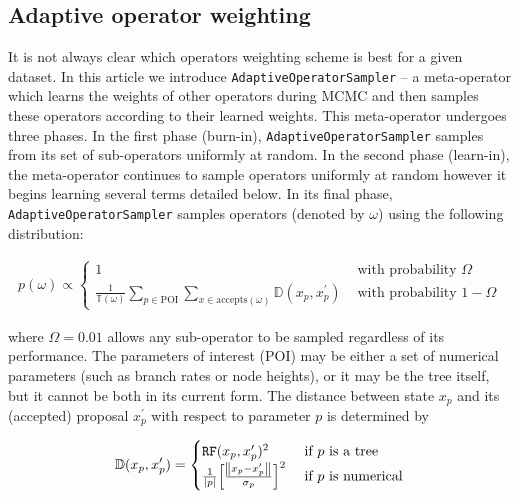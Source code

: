 \documentclass[10pt,letterpaper]{article}
\begin{document}
\clearpage
\subsection*{Adaptive operator weighting}
\label{sect:adaptiveSampling}






It is not always clear which operators weighting scheme is best for a given dataset.
In this article we introduce \texttt{AdaptiveOperatorSampler} -- a meta-operator which learns the weights of other operators during MCMC and then samples these operators according to their learned weights.
This meta-operator undergoes three phases.
In the first phase (burn-in), \texttt{AdaptiveOperatorSampler} samples from its set of sub-operators uniformly at random.
In the second phase (learn-in), the meta-operator continues to sample operators uniformly at random however it begins learning several terms detailed below.
In its final phase, \texttt{AdaptiveOperatorSampler} samples operators (denoted by $\omega$) using the following distribution:


\begin{align}
\label{eqn:adaptiveSampler}
	p(\omega) \propto \begin{cases} 1 & \text{ with probability } \Omega \\ \frac{1}{\mathbb{T}(\omega)} \sum\limits_{p \in \text{POI}}  \sum\limits_{x \in \text{accepts}(\omega)}  \mathbb{D}(x_p, x_p^\prime) & \text{ with probability } 1-\Omega \end{cases}
\end{align}

where $\Omega = 0.01$ allows any sub-operator to be sampled regardless of its performance.
The parameters of interest (POI) may be either a set of numerical parameters (such as branch rates or node heights), or it may be the tree itself, but it cannot be both in its current form.
The distance between state $x_p$ and its (accepted) proposal $x_p^\prime$ with respect to parameter $p$ is determined by


\begin{align}
\label{eqn:distanceFunctions} 
	\mathbb{D}(x_p, x_p^\prime) = \begin{cases} \texttt{RF}(x_p, x_p^\prime)^2 & \text{ if } p \text{ is a tree} \\ 
	\frac{1}{|p|} \Big[ \frac{\norm{x_p - x_p^\prime}}{\sigma_p} \Big]^2    & \text{ if } p \text{ is numerical}  \end{cases}
\end{align}
\end{document}
